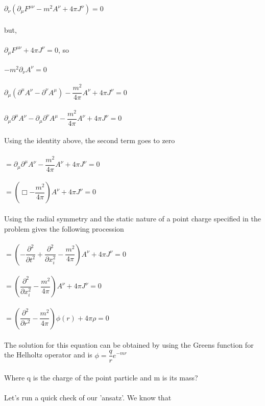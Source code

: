 \documentclass[prb,preprint]
{revtex4-1}
\begin{document}
$\partial_\nu \left(\partial_\mu F^{\mu\nu} - m^2 A^\nu + 4\pi J^\nu\right) = 0$
\\
\\
but, 
\\
\\
$\partial_\mu F^{\mu\nu} + 4\pi J^\nu = 0$, so
\\
\\
$- m^2 \partial_\nu A^\nu = 0$
\\
\\
$\partial_\mu \left(\partial^\mu A^\nu - \partial^\nu A^\mu\right) - \dfrac{m^2}{4\pi} A^\nu + 4\pi J^\nu = 0$
\\
\\
$ \partial_\mu\partial^\mu A^\nu - \partial_\mu\partial^\nu A^\mu - \dfrac{m^2}{4\pi} A^\nu + 4\pi J^\nu = 0$
\\
\\
Using the identity above, the second term goes to zero
\\
\\
$= \partial_\mu\partial^\mu A^\nu - \dfrac{m^2}{4\pi} A^\nu + 4\pi J^\nu = 0$
\\
\\
$= \left(\Box - \dfrac{m^2}{4\pi}\right) A^\nu + 4\pi J^\nu = 0$
\\
\\
Using the radial symmetry and the static nature of a point charge specified in the problem gives the following procession
\\
\\
$= \left(-\dfrac{\partial^2}{\partial t^2} + \dfrac{\partial^2}{\partial x_i^2} - \dfrac{m^2}{4\pi}\right) A^\nu + 4\pi J^\nu = 0$
\\
\\
$= \left(\dfrac{\partial^2}{\partial x_i^2} - \dfrac{m^2}{4\pi}\right) A^\nu + 4\pi J^\nu = 0$
\\
\\
$= \left(\dfrac{\partial^2}{\partial r^2} - \dfrac{m^2}{4\pi}\right) \phi\left(r\right) + 4\pi \rho = 0$
\\
\\
The solution for this equation can be obtained by using the Greens function for the Helholtz operator and is 
$\phi = \dfrac{q}{r}e^{-mr}$
\\
\\
Where q is the charge of the point particle and m is its mass?
\\
\\
Let's run a quick check of our 'ansatz'.  We know that
\\
\end{document}
